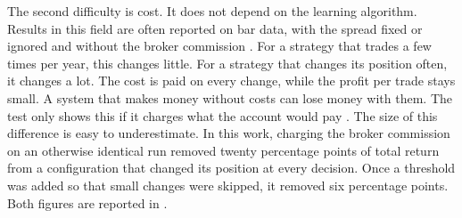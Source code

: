 The second difficulty is cost. It does not depend on the learning algorithm. Results in this field are often reported on bar data, with the spread fixed or ignored and without the broker commission \cite{fischer_reinforcement_2018, pricope_deep_2021}. For a strategy that trades a few times per year, this changes little. For a strategy that changes its position often, it changes a lot. The cost is paid on every change, while the profit per trade stays small. A system that makes money without costs can lose money with them. The test only shows this if it charges what the account would pay \cite{lopez_de_prado_advances_2018}. The size of this difference is easy to underestimate. In this work, charging the broker commission on an otherwise identical run removed twenty percentage points of total return from a configuration that changed its position at every decision. Once a threshold was added so that small changes were skipped, it removed six percentage points. Both figures are reported in .